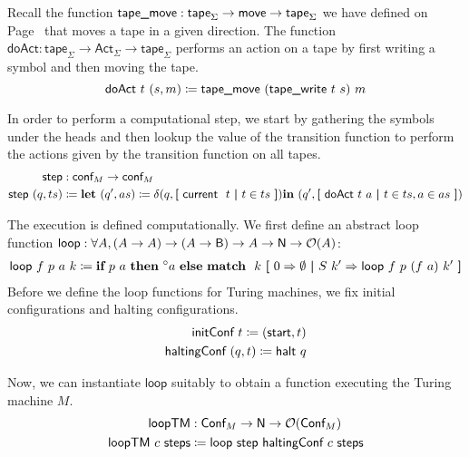 Recall the function $\textsf{tape\_move}{} : \textsf{tape}_\Sigma \rightarrow \textsf{move} \rightarrow \textsf{tape}_\Sigma$ we have defined on Page~\pageref{fig:movetape} that moves a tape in a given direction. 
The function $\textsf{doAct} : \textsf{tape}_\Sigma \rightarrow \textsf{Act}_\Sigma \rightarrow \textsf{tape}_\Sigma$ performs an action on a tape by first writing a symbol and then moving the tape.
\[\textsf{doAct}~t~(s, m) \coloneqq \textsf{tape\_move}~(\textsf{tape\_write}~t~s)~m \]

In order to perform a computational step, we start by gathering the symbols under the heads and then lookup the value of the transition function to perform the actions given by the transition function on all tapes. 
\begin{align*}
  \textsf{step} &: \textsf{conf}_M \rightarrow \textsf{conf}_M \\
  \textsf{step}~(q, ts) &\coloneqq \textbf{let}~ (q', as) \coloneqq \delta (q, \textbf{[}~ \textsf{current}~~t ~\textbf{|}~ t \in ts ~\textbf{]}) \textbf{in}~ (q', \textbf{[}~ \textsf{doAct}~t~a ~\textbf{|}~ t \in ts, a \in as ~\textbf{]}) 
\end{align*}

The execution is defined computationally. We first define an abstract loop function $\textsf{loop} : \forall A, (A \rightarrow A) \rightarrow (A \rightarrow \textsf{B}) \rightarrow A \rightarrow \mathsf{N} \rightarrow \mathcal{O}{(A)}$: 
\begin{align*}
  \textsf{loop}~f~p~a~k \coloneqq \textbf{if}~{p~a}~\textbf{then}~{\prescript{\circ}{}a}~\textbf{else}~{\textbf{match}~~k~\textbf{[}~ 0 \Rightarrow \emptyset ~\textbf{|}~ S~k' \Rightarrow \textsf{loop}~f~p~(f~a)~k' ~\textbf{]}}
\end{align*}
Before we define the loop functions for Turing machines, we fix initial configurations and halting configurations.
\begin{align*}
  \textsf{initConf}~t \coloneqq (\textsf{start}, t) \\
  \textsf{haltingConf}~(q, t) \coloneqq \textsf{halt}~q 
\end{align*}

Now, we can instantiate $\textsf{loop}$ suitably to obtain a function executing the Turing machine $M$.
\begin{align*}
  \textsf{loopTM} &: \textsf{Conf}_M \rightarrow \mathsf{N} \rightarrow \mathcal{O}{(\textsf{Conf}_M)} \\
  \textsf{loopTM}~c~\textsf{steps} &\coloneqq \textsf{loop}~\textsf{step}~\textsf{haltingConf}~c~\textsf{steps}
\end{align*}

